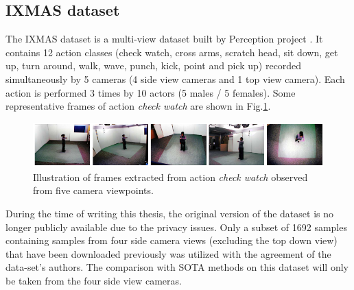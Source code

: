 
\subsection{IXMAS dataset}
    The IXMAS dataset is a multi-view dataset built by Perception project \cite{weinland2006free}.
    It contains 12 action classes (check watch, cross arms, scratch head, sit down, get up, turn around, walk, wave, punch, kick, point and pick up) recorded simultaneously by 5 cameras (4 side view cameras and 1 top view camera).
    Each action is performed 3 times by 10 actors (5 males / 5 females).
    Some representative frames of action \textit{check watch} are shown in Fig.\ref{Fig:IXMAS1}.

    \begin{figure}[h]
        \centering
        \includegraphics[width=1\linewidth]{figs/IXMAS1.png}
        \caption{Illustration of frames extracted from action \textit{check watch} observed from five camera viewpoints.}
        \label{Fig:IXMAS1}
    \end{figure}

    During the time of writing this thesis, the original version of the dataset is no longer publicly available due to the privacy issues.
    Only a subset of 1692 samples containing samples from four side camera views (excluding the top down view) that have been downloaded previously was utilized with the agreement of the data-set's authors.
    The comparison with SOTA methods on this dataset will only be taken from the four side view cameras. 
